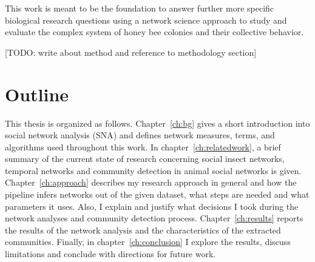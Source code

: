 This work is meant to be the foundation to answer further more specific biological research questions using a network science approach to study and evaluate the complex system of honey bee colonies and their collective behavior.

[TODO: write about method and reference to methodology section]

\section{Outline}
This thesis is organized as follows. Chapter~\ref{ch:bg} gives a short introduction into social network analysis (SNA) and defines network measures, terms, and algorithms used throughout this work.
In chapter~\ref{ch:relatedwork}, a brief summary of the current state of research concerning social insect networks, temporal networks and community detection in animal social networks is given.
Chapter~\ref{ch:approach} describes my research approach in general and how the pipeline infers networks out of the given dataset, what steps are needed and what parameters it uses.
Also, I explain and justify what decisions I took during the network analyses and community detection process.
Chapter~\ref{ch:results} reports the results of the network analysis and the characteristics of the extracted communities.
Finally, in chapter~\ref{ch:conclusion} I explore the results, discuss limitations and conclude with directions for future work.